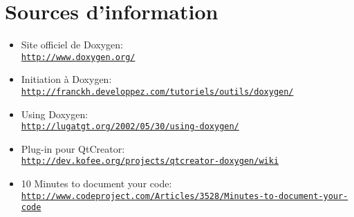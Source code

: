 \section*{Sources d'information}
  \begin{itemize}
    \item Site officiel de Doxygen: \\
    \href{http://www.doxygen.org/}{\texttt{http://www.doxygen.org/}}
    \item Initiation à Doxygen:\\
     \href{http://franckh.developpez.com/tutoriels/outils/doxygen/}{\texttt{http://franckh.developpez.com/tutoriels/outils/doxygen/}}
    \item Using Doxygen: \\
    \href{http://lugatgt.org/2002/05/30/using-doxygen/}{\texttt{http://lugatgt.org/2002/05/30/using-doxygen/}}
    \item Plug-in pour QtCreator:\\
    \href{http://dev.kofee.org/projects/qtcreator-doxygen/wiki}{\texttt{http://dev.kofee.org/projects/qtcreator-doxygen/wiki}}
    \item 10 Minutes to document your code:\\ 
    \href{http://www.codeproject.com/Articles/3528/Minutes-to-document-your-code}{\texttt{http://www.codeproject.com/Articles/3528/Minutes-to-document-your-code}}
  \end{itemize}
